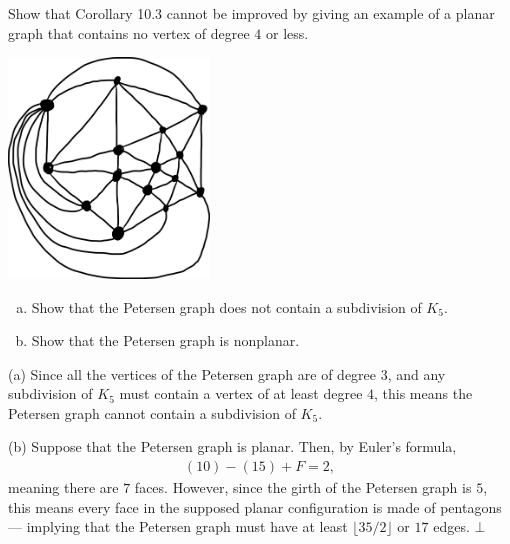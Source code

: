 \documentclass[10pt]{extarticle}
\title{}
\author{}
\date{}
\begin{document}
  \begin{problem}{4}
    Show that Corollary 10.3 cannot be improved by giving an example of a planar graph that contains no vertex of degree $4$ or less.
    \tcblower
    \begin{center}
      \includegraphics[width=0.4\textwidth]{images/10_4_sol.png}
    \end{center}
  \end{problem}
  \begin{problem}{5}
    \begin{enumerate}[(a)]
      \item Show that the Petersen graph does not contain a subdivision of $K_5$.
      \item Show that the Petersen graph is nonplanar.
    \end{enumerate}
    \tcblower
    \begin{problem}{(a)}
      Since all the vertices of the Petersen graph are of degree $3$, and any subdivision of $K_5$ must contain a vertex of at least degree $4$, this means the Petersen graph cannot contain a subdivision of $K_5$.
    \end{problem}
    \begin{problem}{(b)}
      Suppose that the Petersen graph is planar. Then, by Euler's formula,
      \begin{align*}
        (10) - (15) + F = 2,
      \end{align*}
      meaning there are $7$ faces. However, since the girth of the Petersen graph is $5$, this means every face in the supposed planar configuration is made of pentagons --- implying that the Petersen graph must have at least $\lfloor35/2\rfloor$ or $17$ edges. $\bot$
    \end{problem}
  \end{problem}
\end{document}
